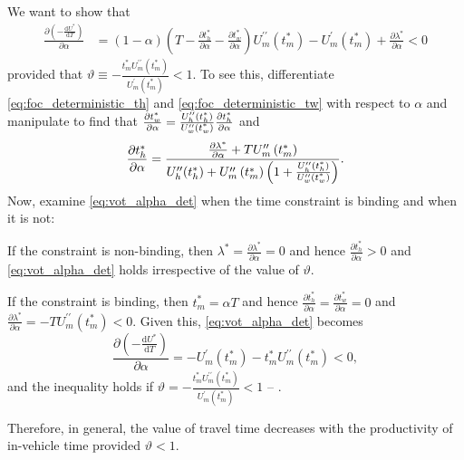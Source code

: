 \documentclass[12pt,a4paper,british]{article}
\makeatletter
\newenvironment{proof}[1][\proofname]{\par
    \normalfont\topsep6\p@\@plus6\p@\relax
    \trivlist
    \itemindent\parindent
    \item[\hskip\labelsep
          \scshape
      #1]\ignorespaces
  }{%
    \endtrivlist\@endpefalse
  }
\providecommand{\proofname}{Proof}
\makeatother
\begin{document}
\begin{proof}
We want to show that
\begin{align}
\frac{\partial\left(-\frac{\mathrm{d}U^{\ast}}{\mathrm{d}T}\right)}{\partial\alpha} & =\left(1-\alpha\right)\left(T-\frac{\partial t_{h}^{\ast}}{\partial\alpha} - \frac{\partial t_{w}^{\ast}}{\partial\alpha}\right)U_{m}^{\prime\prime}\left(t_{m}^{\ast}\right)-U_{m}^{\prime}\left(t_{m}^{\ast}\right)+\frac{\partial\lambda^{\ast}}{\partial\alpha} < 0
\label{eq:vot_alpha_det}
\end{align}
provided that $\vartheta\equiv-\frac{t_{m}^{\ast}U_{m}^{\prime\prime}\left(t_{m}^{\ast}\right)}{U_{m}^{\prime}\left(t_{m}^{\ast}\right)}<1$. To see this, differentiate \eqref{eq:foc_deterministic_th} and \eqref{eq:foc_deterministic_tw} with respect to $\alpha$ and manipulate to find that $\frac{\partial t_{w}^{\ast}}{\partial\alpha} = \frac{U_{h}^{\prime\prime} \text{\ensuremath{\left(t_{h}^{\ast}\right)}}}{U_{w}^{\prime\prime}\text{\ensuremath{\left(t_{w}^{\ast}\right)}}}\frac{\partial t_{h}^{\ast}}{\text{\ensuremath{\partial\alpha}}}$ and%
\begin{equation*}
\frac{\partial t_{h}^{\ast}}{\partial\alpha}=\frac{\frac{\partial\lambda^{\ast}}{\partial\alpha}+TU_{m}^{\prime\prime}\left(t_{m}^{\ast}\right)}{U_{h}^{\prime\prime}\text{\ensuremath{\left(t_{h}^{\ast}\right)}}+U_{m}^{\prime\prime}\left(t_{m}^{\ast}\right)\left(1+\frac{U_{h}^{\prime\prime}\text{\ensuremath{\left(t_{h}^{\ast}\right)}}}{U_{w}^{\prime\prime}\text{\ensuremath{\left(t_{w}^{\ast}\right)}}}\right)}.
\end{equation*}
Now, examine \eqref{eq:vot_alpha_det} when the time constraint is binding and when it is not:
\begin{casenv}
\item If the constraint is non-binding, then $\lambda^{\ast} = \frac{\partial\lambda^{\ast}}{\partial\alpha} = 0$ and hence $\frac{\partial t_{h}^{\ast}}{\partial\alpha}>0$ and \eqref{eq:vot_alpha_det} holds irrespective of the value of $\vartheta$.
\item If the constraint is binding, then $t_{m}^{\ast}=\alpha T$ and hence $\frac{\partial t_{h}^{\ast}}{\partial\alpha}=\frac{\partial t_{w}^{\ast}}{\partial\alpha}=0$ and $\frac{\partial\lambda^{\ast}}{\partial\alpha}=-TU_{m}^{\prime\prime}\left(t_{m}^{\ast}\right)<0$. Given this, \eqref{eq:vot_alpha_det} becomes%
\begin{equation*}
\frac{\partial\left(-\frac{\mathrm{d}U^{\ast}}{\mathrm{d}T}\right)}{\partial\alpha}=-U_{m}^{\prime}\left(t_{m}^{\ast}\right)-t_{m}^{\ast}U_{m}^{\prime\prime}\left(t_{m}^{\ast}\right) < 0,
\end{equation*}
and the inequality holds if $\vartheta=-\frac{t_{m}^{\ast}U_{m}^{\prime\prime}\left(t_{m}^{\ast}\right)}{U_{m}^{\prime}\left(t_{m}^{\ast}\right)}<1$ -- .
\end{casenv}
Therefore, in general, the value of travel time decreases with the productivity of in-vehicle time provided $\vartheta<1$.
\end{proof}
\end{document}
